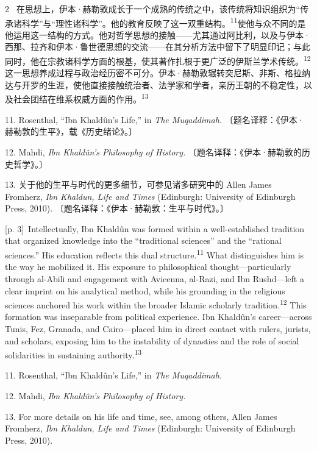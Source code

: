 \documentclass[10pt,a4paper]{article}
\begin{document}
\begin{paracol}{2}
\switchcolumn*
{\scriptsize\color{gray} [p. 3]}\ 在思想上，伊本·赫勒敦成长于一个成熟的传统之中，该传统将知识组织为“传承诸科学”与“理性诸科学”。他的教育反映了这一双重结\mbox{构。\textsuperscript{11}}使他与众不同的是他运用这一结构的方式。他对哲学思想的接触——尤其通过阿比利，以及与伊本·西那、拉齐和伊本·鲁世德思想的交流——在其分析方法中留下了明显印记；与此同时，他在宗教诸科学方面的根基，使其著作扎根于更广泛的伊斯兰学术传\mbox{统。\textsuperscript{12}}这一思想养成过程与政治经历密不可分。伊本·赫勒敦辗转突尼斯、非斯、格拉纳达与开罗的生涯，使他直接接触统治者、法学家和学者，亲历王朝的不稳定性，以及社会团结在维系权威方面的作\mbox{用。\textsuperscript{13}}\par{\small 11. Rosenthal, “Ibn Khaldûn’s Life,” in \textit{The Muqaddimah.} 〔题名译释：《伊本·赫勒敦的生平》，载《历史绪论》。〕\par}{\small 12. Mahdi, \textit{Ibn Khaldûn’s Philosophy of History.} 〔题名译释：《伊本·赫勒敦的历史哲学》。〕\par}{\small 13. 关于他的生平与时代的更多细节，可参见诸多研究中的 Allen James Fromherz, \textit{Ibn Khaldun, Life and Times} (Edinburgh: University of Edinburgh Press, 2010). 〔题名译释：《伊本·赫勒敦：生平与时代》。〕\par}
\switchcolumn
{\scriptsize\color{gray} [p. 3]}\ Intellectually, Ibn Khaldûn was formed within a well-established tradition that organized knowledge into the “traditional sciences” and the “rational sciences.” His education reflects this dual structure.\nobreak\textsuperscript{11} What distinguishes him is the way he mobilized it. His exposure to philosophical thought—particularly through al-Abili and engagement with Avicenna, al-Razi, and Ibn Rushd—left a clear imprint on his analytical method, while his grounding in the religious sciences anchored his work within the broader Islamic scholarly tradition.\nobreak\textsuperscript{12} This formation was inseparable from political experience. Ibn Khaldûn’s career—across Tunis, Fez, Granada, and Cairo—placed him in direct contact with rulers, jurists, and scholars, exposing him to the instability of dynasties and the role of social solidarities in sustaining authority.\nobreak\textsuperscript{13}\par{\small 11. Rosenthal, “Ibn Khaldûn’s Life,” in \textit{The Muqaddimah.}\par}{\small 12. Mahdi, \textit{Ibn Khaldûn’s Philosophy of History.}\par}{\small 13. For more details on his life and time, see, among others, Allen James Fromherz, \textit{Ibn Khaldun, Life and Times} (Edinburgh: University of Edinburgh Press, 2010).\par}

\end{paracol}
\end{document}
